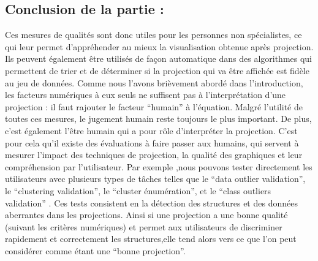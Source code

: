 \subsection{Conclusion de la partie :} 
Ces mesures de qualités sont donc utiles pour les personnes non spécialistes, ce qui leur permet d’appréhender au mieux la visualisation obtenue après projection.
Ils peuvent également être utilisés de façon automatique dans des algorithmes qui permettent de trier et de déterminer si la projection qui va être affichée est fidèle au jeu de données\cite{bertini2011quality-AutomatisationAlgo}. 
\newline
Comme nous l’avons brièvement abordé dans l'introduction, les facteurs numériques à eux seuls ne suffisent pas à l’interprétation d’une projection : il faut rajouter le facteur “humain” à l’équation.
Malgré l’utilité de toutes ces mesures, le jugement humain reste toujours le plus important\cite{AndradaTatu2010visual}. De plus, c'est également l’être humain qui a pour rôle d’interpréter la projection.  C’est pour cela qu’il existe des évaluations à faire passer aux humains, qui servent à mesurer l’impact des techniques de projection, la qualité des graphiques et leur compréhension par l’utilisateur. Par exemple ,nous pouvons tester directement les utilisateurs avec plusieurs types de tâches telles que le “data outlier validation”, le “clustering validation”, le “cluster énumération”, et le “class outliers validation” \cite{HeulotAnEvaluation}. 
Ces tests consistent en la détection des structures et des données aberrantes dans les projections.
Ainsi si une projection a une bonne qualité (suivant les critères numériques) et permet aux utilisateurs de discriminer rapidement et correctement les structures,elle tend alors vers ce que l’on peut considérer comme étant une “bonne projection”.
 





